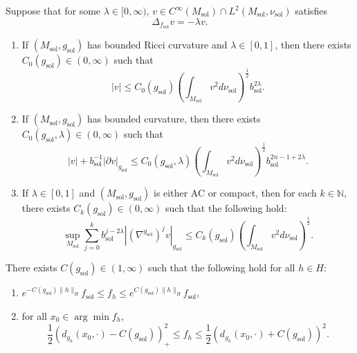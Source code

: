 \documentclass[10pt,a4paper]{amsart}
\providecommand{\sol}{\operatorname{sol}}
\begin{document}
\begin{lemma} \label{lem:eigenfunctiongrowth} Suppose that for some $\lambda \in [0,\infty)$, $v\in C^{\infty}(M_{\sol})\cap L^2(M_{\sol},\nu_{\sol})$ satisfies
\begin{equation} \label{eq:eigenfunction} \Delta_{f_{\sol}} v = -\lambda v .
\end{equation}
\begin{enumerate}
    \item If $(M_{\sol},g_{\sol})$ has bounded Ricci curvature and $\lambda \in [0,1]$, then there exists $C_0(g_{\sol}) \in (0,\infty)$ such that
    \label{lem:eigenfunctiongrowth0}
    \begin{equation*}
        |v|\leq C_0(g_{\sol})\left( \int_{M_{\sol}}v^2 d\nu_{\sol} \right)^{\frac{1}{2}}b_{\sol}^{2\lambda}.
    \end{equation*}

    \item If $(M_{\sol},g_{\sol})$ has bounded curvature, then there exists $C_0(g_{\sol},\lambda) \in (0,\infty)$ such that \label{lem:eigenfunctiongrowth1} 
    \begin{equation*} |v| +b_{\sol}^{-1}|\partial v|_{g_{\sol}} 
    \leq C_0(g_{\sol},\lambda) \left( \int_{M_{\sol}}v^2 d\nu_{\sol} \right)^{\frac{1}{2}}b_{\sol}^{2n-1+2\lambda}.
    \end{equation*}

    \item \label{lem:eigenfunctiongrowth2} If $\lambda \in [0,1]$ and $(M_{\sol},g_{\sol})$ is either AC or compact, then for each $k\in \mathbb{N}$, there exists $C_k(g_{\sol}) \in (0,\infty)$ such that the following hold:
    \begin{equation*}
    \sup_{M_{\sol}}\sum_{j=0}^k b_{\sol}^{j-2\lambda}|(\nabla^{g_{\sol}})^j v|_{g_{\sol}}\leq C_k(g_{\sol}) \left( \int_{M_{\sol}} v^2 d\nu_{\sol}\right)^{\frac{1}{2}}.
\end{equation*}
\end{enumerate}
\end{lemma}

\begin{lemma}\label{lem; equiv of potentials}
    There exists $C(g_{\sol}) \in (1,\infty)$ such that the following hold for all $h\in H$:
\begin{enumerate}
    \item \label{lem; equiv of potentials1}
    $e^{-C(g_{\sol})\|h\|_H} f_{\sol} \leq f_{h} \leq e^{C(g_{\sol})\|h\|_H}f_{\sol}$,
    \item \label{lem; equiv of potentials2} for all $x_0\in \arg\min f_{h}$, 
\begin{equation*}
    \frac{1}{2}(d_{g_{h}}(x_0,\cdot)-C(g_{\sol}))_+^2 \le f_{h}\le \frac{1}{2}(d_{g_{h}}(x_0,\cdot)+C(g_{\sol}))^2.
\end{equation*}
\end{enumerate}     
\end{lemma}
\end{document}
